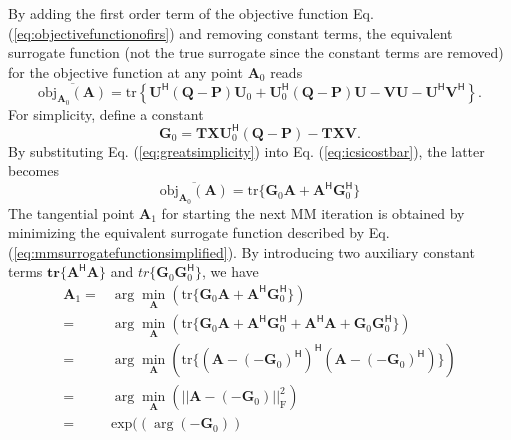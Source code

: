 \documentclass[12pt,draftclsnofoot,onecolumn,journal]{IEEEtran}
\begin{document}
By adding the first order term of the objective function Eq. (\ref{eq:objectivefunctionofirs}) and removing constant terms, the equivalent surrogate function (not the true surrogate since the constant terms are removed) for the objective function at any point $\mathbf A_0$ reads
\begin{equation}
\overline{\mathrm{obj_{\mathbf A_0}}(\mathbf A)}
=\mathrm{tr}\left\{\mathbf U^{\mathsf H}(\mathbf Q-\mathbf P)\mathbf U_0+ \mathbf U_0^{\mathsf H}(\mathbf Q-\mathbf P)\mathbf U-\mathbf V\mathbf{U}-\mathbf U^{\mathsf H}\mathbf V^{\mathsf H}\right\}.
\label{eq:icsicostbar}
\end{equation}
For simplicity, define a constant
\begin{equation}
\mathbf G_0=\mathbf{TX} \mathbf U_0^{\mathsf H}(\mathbf Q-\mathbf P)-\mathbf{TXV}.
\label{eq:greatsimplicity}
\end{equation}
By substituting Eq. (\ref{eq:greatsimplicity}) into Eq. (\ref{eq:icsicostbar}), the latter becomes
\begin{equation}
\overline{\mathrm{obj_{\mathbf A_0}}(\mathbf A)}
=\mathrm{tr}\{\mathbf{G}_0\mathbf{A}+\mathbf A^{\mathsf H} \mathbf G_0^{\mathsf H}\}
\label{eq:mmsurrogatefunctionsimplified}
\end{equation}
The tangential point $\mathbf A_1$ for starting the next MM iteration is obtained by minimizing the equivalent surrogate function described by Eq. (\ref{eq:mmsurrogatefunctionsimplified}). By introducing two auxiliary constant terms $\mathbf{tr}\{\mathbf A^{\mathsf H}\mathbf A\}$ and $tr\{\mathbf G_0 \mathbf G_0^{\mathsf H}\}$, we have  \cite{sankuru2020designing}
\begin{equation}
\begin{split}
\mathbf A_1=&\arg\min_\mathbf A(\mathrm{tr}\{\mathbf{G}_0\mathbf{A}+\mathbf A^{\mathsf H} \mathbf G_0^{\mathsf H}\})\\
=&\arg\min_\mathbf A(\mathrm{tr}\{\mathbf{G}_0\mathbf{A}+\mathbf A^{\mathsf H} \mathbf G_0^{\mathsf H}+\mathbf A^{\mathsf H}\mathbf A+\mathbf G_0 \mathbf G_0^{\mathsf H}\})\\
=&\arg\min_\mathbf A(\mathrm{tr}\{(\mathbf A-(-\mathbf G_0)^{\mathsf H})^{\mathsf H}(\mathbf A-(-\mathbf G_0)^{\mathsf H})\})\\
=&\arg\min_\mathbf A(||\mathbf A-(-\mathbf G_0)||_{\mathrm{F}}^2)\\
=&\mathrm{exp}((\arg ( -\mathbf G_0))
\end{split}
\end{equation}
\end{document}
